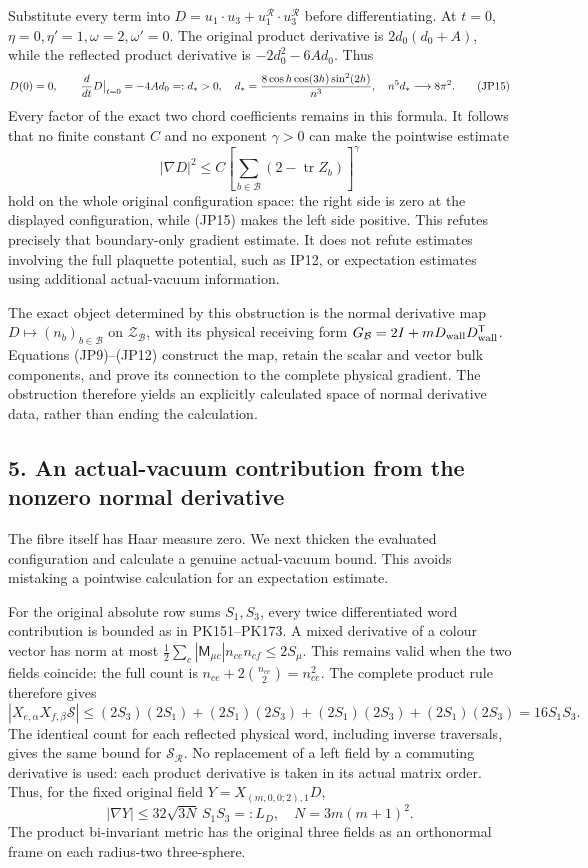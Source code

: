 \documentclass[11pt]{article}
\begin{document}
Substitute every term into \(D=u_1\cdot u_3+
u_1^{\mathcal R}\cdot u_3^{\mathcal R}\) before differentiating.
At \(t=0\), \(\eta=0,\eta'=1,\omega=2,\omega'=0\). The original product derivative
is \(2d_0(d_0+A)\), while the reflected product derivative is
\(-2d_0^2-6Ad_0\). Thus
\[
 D(0)=0,\qquad
 {d\over dt}D\big|_{t=0}=-4Ad_0=:d_*>0,
 \quad
 d_*={8\cos h\cos(3h)\sin^2(2h)\over n^3},
 \quad n^5d_*\longrightarrow8\pi^2.
 \tag{JP15}
\]
Every factor of the exact two chord coefficients remains in this formula.
It follows that no finite constant \(C\) and no exponent \(\gamma>0\)
can make the pointwise estimate
\[
 |\nabla D|^2\le
 C\left[\sum_{b\in\mathcal B}(2-\operatorname{tr}Z_b)\right]^\gamma
 \tag{JP16}
\]
hold on the whole original configuration space: the right side is zero
at the displayed configuration, while (JP15) makes the left side
positive. This refutes precisely that boundary-only gradient estimate.
It does not refute estimates involving the full plaquette potential,
such as IP12, or expectation estimates using additional actual-vacuum
information.

The exact object determined by this obstruction is the normal derivative
map
\(D\mapsto(n_b)_{b\in\mathcal B}\) on
\(\mathcal Z_{\mathcal B}\), with its physical receiving form
\(G_{\mathcal B}=2I+mD_{\rm wall}D_{\rm wall}^{\mathsf T}\).
Equations (JP9)–(JP12) construct the map, retain the scalar and vector
bulk components, and prove its connection to the complete physical
gradient. The obstruction therefore yields an explicitly calculated
space of normal derivative data, rather than ending the calculation.

\subsection*{5. An actual-vacuum contribution from the nonzero normal derivative}

The fibre itself has Haar measure zero. We next thicken the evaluated
configuration and calculate a genuine actual-vacuum bound. This avoids
mistaking a pointwise calculation for an expectation estimate.

For the original absolute row sums \(S_1,S_3\), every twice
differentiated word contribution is bounded as in PK151–PK173. A mixed
derivative of a colour vector has norm at most
\(\frac12\sum_c|\mathsf M_{\mu c}|n_{ce}n_{cf}\le2S_\mu\).
This remains valid when the two fields coincide: the full count is
\(n_{ce}+2\binom{n_{ce}}2=n_{ce}^2\).
The complete product rule therefore gives
\[
 |X_{e,\alpha}X_{f,\beta}\mathcal S|
 \le (2S_3)(2S_1)+(2S_1)(2S_3)
       +(2S_1)(2S_3)+(2S_1)(2S_3)
 =16S_1S_3.
\]
The identical count for each reflected physical word, including inverse
traversals, gives the same bound for \(\mathcal S_{\mathcal R}\).
No replacement of a left field by a commuting derivative is used: each
product derivative is taken in its actual matrix order. Thus, for the
fixed original field \(Y=X_{(m,0,0;2),1}D\),
\[
 |\nabla Y|\le32\sqrt{3N}\,S_1S_3=:L_D,
 \quad N=3m(m+1)^2.\tag{JP17}
\]
The product bi-invariant metric has the original three fields as an
orthonormal frame on each radius-two three-sphere.
\end{document}
